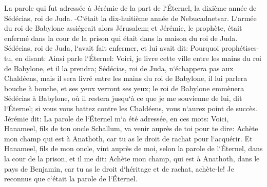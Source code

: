 \verse La parole qui fut adressée à Jérémie de la part de l`Éternel, la dixième année de Sédécias, roi de Juda. -C`était la dix-huitième année de Nebucadnetsar. 
\verse L`armée du roi de Babylone assiégeait alors Jérusalem; et Jérémie, le prophète, était enfermé dans la cour de la prison qui était dans la maison du roi de Juda. 
\verse Sédécias, roi de Juda, l`avait fait enfermer, et lui avait dit: Pourquoi prophétises-tu, en disant: Ainsi parle l`Éternel: Voici, je livre cette ville entre les mains du roi de Babylone, et il la prendra; 
\verse Sédécias, roi de Juda, n`échappera pas aux Chaldéens, mais il sera livré entre les mains du roi de Babylone, il lui parlera bouche à bouche, et ses yeux verront ses yeux; 
\verse le roi de Babylone emmènera Sédécias à Babylone, où il restera jusqu`à ce que je me souvienne de lui, dit l`Éternel; si vous vous battez contre les Chaldéens, vous n`aurez point de succès. 
\verse Jérémie dit: La parole de l`Éternel m`a été adressée, en ces mots: 
\verse Voici, Hanameel, fils de ton oncle Schallum, va venir auprès de toi pour te dire: Achète mon champ qui est à Anathoth, car tu as le droit de rachat pour l`acquérir. 
\verse Et Hanameel, fils de mon oncle, vint auprès de moi, selon la parole de l`Éternel, dans la cour de la prison, et il me dit: Achète mon champ, qui est à Anathoth, dans le pays de Benjamin, car tu as le droit d`héritage et de rachat, achète-le! Je reconnus que c`était la parole de l`Éternel. 
